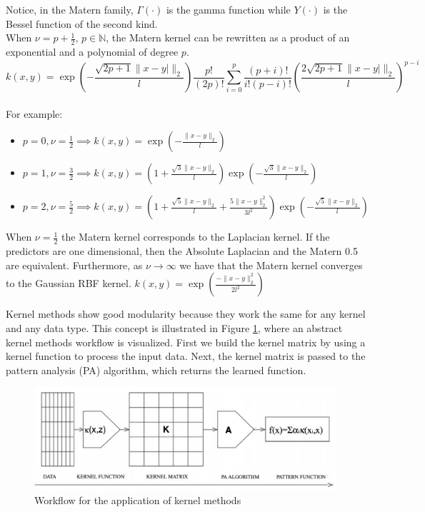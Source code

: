 Notice, in the Matern family, $\Gamma(\cdot)$ is the gamma function while $Y(\cdot)$ is the Bessel function of the second kind.
\\
When $\nu=p+\frac{1}{2}$, $p \in \mathbb{N}$, the Matern kernel can be rewritten as a product of an exponential and a polynomial of degree $p$. 
\\
$$k(x,y)=\exp \left(-{\frac {{\sqrt {2p+1}}\|x-y|\|_{2}}{l }}\right){\frac {p!}{(2p)!}}\sum\limits_{i=0}^{p}{\frac {(p+i)!}{i!(p-i)!}}\left({\frac {2{\sqrt {2p+1}}\|x-y|\|_{2}}{l }}\right)^{p-i}$$
\\
For example:
\begin{itemize}
    \item $p=0,\nu=\frac{1}{2} \implies k(x,y)=\exp\left(-\frac{\|x-y\|_{2}}{l}\right)$
    \item $p=1,\nu=\frac{3}{2} \implies 
    k(x,y)=\left(1+{\frac {{\sqrt {3}}\|x-y\|_{2}}{l }}\right)\exp \left(-{\frac {{\sqrt {3}}\|x-y\|_{2}}{l }}\right)$
    \item $p=2,\nu=\frac{5}{2} \implies k(x,y)=\left(1+{\frac {{\sqrt {5}}\|x-y\|_{2}}{l }}+{\frac {5\|x-y\|_{2}^{2}}{3 l ^{2}}}\right)\exp \left(-{\frac {{\sqrt {5}}\|x-y\|_{2}}{l }}\right)$
\end{itemize}

When $\nu=\frac{1}{2}$ the Matern kernel corresponds to the Laplacian kernel. If the predictors are one dimensional, then the Absolute Laplacian and the Matern 0.5 are equivalent. %
Furthermore, as $\nu \to \infty$ we have that the Matern kernel converges to the Gaussian RBF kernel.
$k(x,y)=\exp\left(\frac{-\|x-y\|_{2}^2}{2l^2}\right)$




Kernel methods show good modularity because they work the same for any kernel and any data type. This concept is illustrated in Figure \ref{fig:workflow_kernels}, where an abstract kernel methods workflow is visualized. First we build the kernel matrix by using a kernel function to process the input data. Next, the kernel matrix is passed to the pattern analysis (PA) algorithm, which returns the learned function.

\begin{figure}[!ht]
    \includegraphics[width=\textwidth]{images/workflow_kernels.png}
    \caption{Workflow for the application of kernel methods \cite{shawe2004kernel}}
    \label{fig:workflow_kernels}
\end{figure}